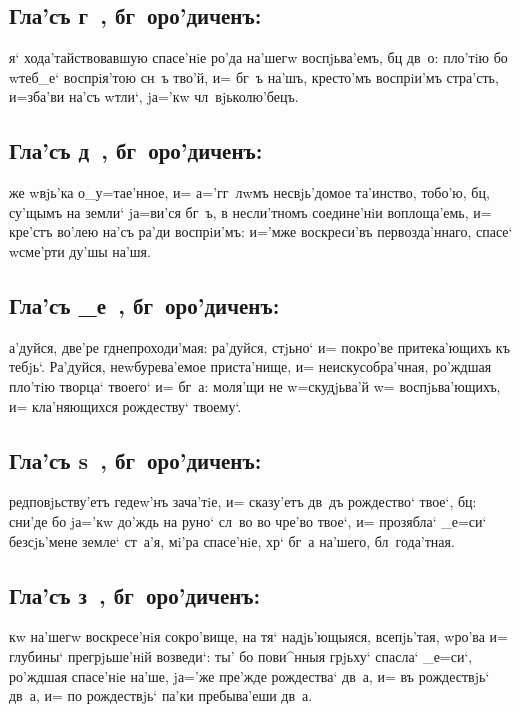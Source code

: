 \documentclass[14pt,twoside]{extreport}
\renewcommand{\*}{~~\raise3pt\hbox{\footnotesize*}}
\begin{document}
\subsection{Гла'съ г~, бг~оро'диченъ:}

я` хода'тайствовавшую спасе'нiе ро'да на'шегw воспjьва'емъ, бц
дв~о: пло'тiю бо w\т теб_е` воспрiя'тою сн~ъ тво'й, и= бг~ъ на'шъ, кресто'мъ
воспрiи'мъ стра'сть, и=зба'ви на'съ w\т тли`, jа='кw чл~вjьколю'бецъ.

\subsection{Гла'съ д~, бг~оро'диченъ:}

же w\т вjь'ка о_у=тае'нное, и= а='гг~лwмъ несвjь'домое та'инство,
тобо'ю, бц, су'щымъ на земли` jа=ви'ся бг~ъ, в несли'тномъ соедине'нiи
воплоща'емь, и= кре'стъ во'лею на'съ ра'ди воспрiи'мъ: и='мже воскреси'въ
первозда'ннаго, спасе` w\т сме'рти ду'шы на'шя.

\subsection{Гла'съ _е~, бг~оро'диченъ:}

а'дуйся, две'ре гд непроходи'мая: ра'дуйся, стjьно` и= покро'ве
притека'ющихъ къ тебjь`. Ра'дуйся, неwбурева'емое приста'нище, и=
неискусобра'чная, ро'ждшая пло'тiю творца` твоего` и= бг~а: моля'щи не
w=скудjьва'й w= воспjьва'ющихъ, и= кла'няющихся рождеству` твоему`.

\subsection{Гла'съ s~, бг~оро'диченъ:}

редповjьству'етъ гедеw'нъ зача'тiе, и= ска\-зу'\-етъ дв~дъ рождество`
твое`, бц: сни'де бо jа='кw до'ждь на руно` сл~во во чре'во твое`, и=
прозябла` _е=си` без\ъ сjь'мене земле` ст~а'я, мi'ра спасе'нiе, хр` бг~а
на'шего, бл~года'тная.

\subsection{Гла'съ з~, бг~оро'диченъ:}

кw на'шегw воскресе'нiя сокро'вище, на тя` надjь'ющыяся,
всепjь'тая, w\т ро'ва и= глубины` прегрjьше'нiй возведи`: ты' бо пови^нныя
грjьху` спасла` _е=си`, ро'ждшая спасе'нiе на'ше, jа='же пре'жде рождества`
дв~а, и= въ рождествjь` дв~а, и= по рождествjь` па'ки пребыва'еши дв~а.
\end{document}
